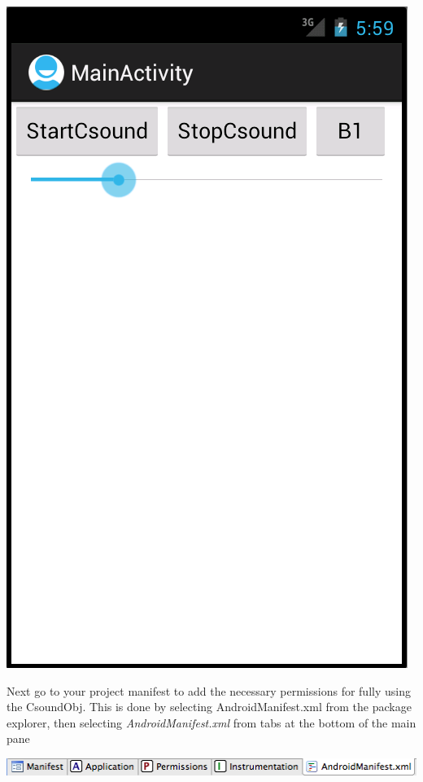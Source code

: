 \documentclass[11pt]{article}
\begin{document}
\begin{center}
\includegraphics[scale=0.30]{images/CsoundBasicAppUIDia}
\end{center}

Next go to your project manifest to add the necessary permissions for fully using the CsoundObj. This is done by selecting AndroidManifest.xml from the package explorer, then selecting  \textit{AndroidManifest.xml} from tabs at the bottom of the main pane

\begin{center}
\includegraphics[scale=0.75]{images/ManifestTabs}
\end{center}
\end{document}
